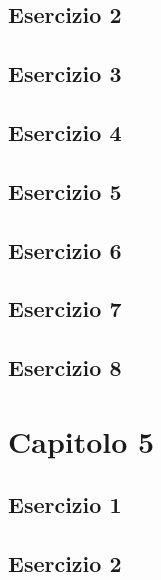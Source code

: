 \documentclass[a4paper,12pt,oneside]{book}
\begin{document}
\hypertarget{esercizio-2-1}{%
\subsection{Esercizio 2}\label{esercizio-2-1}}

\hypertarget{esercizio-3-1}{%
\subsection{Esercizio 3}\label{esercizio-3-1}}

\hypertarget{esercizio-4}{%
\subsection{Esercizio 4}\label{esercizio-4}}

\hypertarget{esercizio-5}{%
\subsection{Esercizio 5}\label{esercizio-5}}

\hypertarget{esercizio-6}{%
\subsection{Esercizio 6}\label{esercizio-6}}

\hypertarget{esercizio-7}{%
\subsection{Esercizio 7}\label{esercizio-7}}

\hypertarget{esercizio-8}{%
\subsection{Esercizio 8}\label{esercizio-8}}

\hypertarget{capitolo-5}{%
\section{Capitolo 5}\label{capitolo-5}}

\hypertarget{esercizio-1-3}{%
\subsection{Esercizio 1}\label{esercizio-1-3}}

\hypertarget{esercizio-2-2}{%
\subsection{Esercizio 2}\label{esercizio-2-2}}
\end{document}

